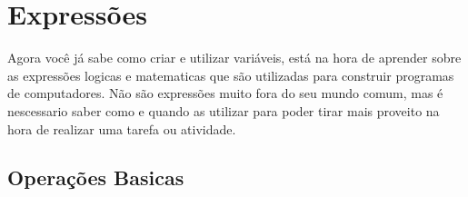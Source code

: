 \section{Expressões}

Agora você já sabe como criar e utilizar variáveis, está na hora de aprender sobre as expressões logicas e matematicas que são utilizadas para construir programas de computadores. Não são expressões muito fora do seu mundo comum, mas é nescessario saber como e quando as utilizar para poder tirar mais proveito na hora de realizar uma tarefa ou atividade.

\subsection{Operações Basicas}